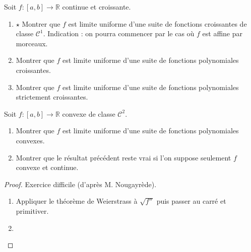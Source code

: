\documentclass[french,a4paper]{article}
\newcommand{\R}{\mathbb{R}}
\theoremstyle{plain}
\theoremstyle{definition}
\theoremstyle{remark}
\begin{document}
\begin{ex}{}
	Soit $f:[a,b]\to\R$ continue et croissante.
	\begin{enumerate}
		\item $\star$ Montrer que $f$ est limite uniforme d'une suite de fonctions croissantes de classe $\mathcal{C}^1$. Indication : on pourra commencer par le cas où $f$ est affine par morceaux.
		\item Montrer que $f$ est limite uniforme d'une suite de fonctions polynomiales croissantes.
		\item Montrer que $f$ est limite uniforme d'une suite de fonctions polynomiales strictement croissantes.
	\end{enumerate}
\end{ex}

\begin{ex}{}
	Soit $f:[a,b]\to\R$ convexe de classe $\mathcal{C}^2$.
	\begin{enumerate}
		\item Montrer que $f$ est limite uniforme d'une suite de fonctions polynomiales convexes.
		\item Montrer que le résultat précédent reste vrai si l'on suppose seulement $f$ convexe et continue.
	\end{enumerate}
\end{ex}
\begin{proof}
	Exercice difficile (d'après M. Nougayrède).
	\begin{enumerate}
		\item Appliquer le théorème de Weierstrass à $\sqrt{f''}$ puis passer au carré et primitiver.
		\item 
	\end{enumerate}
\end{proof}
\end{document}

